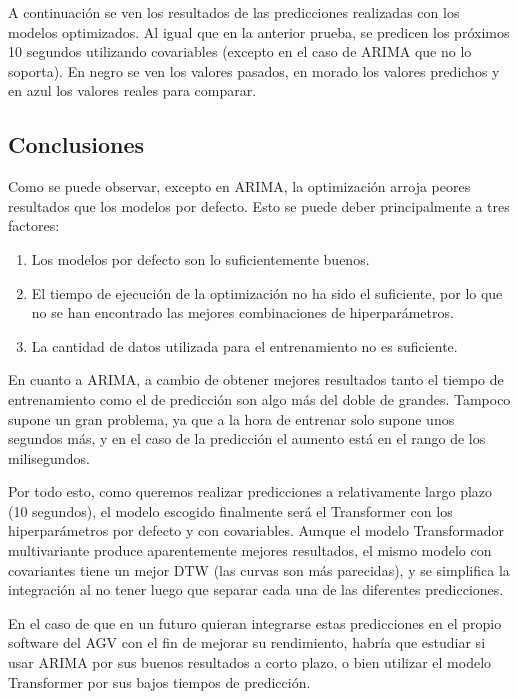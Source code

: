A continuación se ven los resultados de las predicciones realizadas con los modelos optimizados. 
Al igual que en la anterior prueba, se predicen los próximos 10 segundos utilizando covariables 
(excepto en el caso de ARIMA que no lo soporta). En negro se ven los valores pasados, en morado 
los valores predichos y en azul los valores reales para comparar.


\subsection{Conclusiones}

Como se puede observar, excepto en ARIMA, la optimización arroja peores resultados que los modelos por defecto. Esto 
se puede deber principalmente a tres factores:
\begin{enumerate}
    \item Los modelos por defecto son lo suficientemente buenos.
    \item El tiempo de ejecución de la optimización no ha sido el suficiente, por lo que no se han encontrado las 
        mejores combinaciones de hiperparámetros.
    \item La cantidad de datos utilizada para el entrenamiento no es suficiente.
\end{enumerate}

En cuanto a ARIMA, a cambio de obtener mejores resultados tanto el tiempo de entrenamiento como el de predicción 
son algo más del doble de grandes. Tampoco supone un gran problema, ya que a la hora de entrenar solo 
supone unos segundos más, y en el caso de la predicción el aumento está en el rango de los milisegundos.

Por todo esto, como queremos realizar predicciones a relativamente largo plazo (10 segundos), el modelo escogido 
finalmente será el Transformer con los hiperparámetros por defecto y con covariables. Aunque el modelo Transformador
multivariante produce aparentemente mejores resultados, el mismo modelo con covariantes tiene un mejor DTW (las curvas
son más parecidas), y se simplifica la integración al no tener luego que separar cada una de las diferentes predicciones. 

En el caso de que en un futuro quieran integrarse estas predicciones en el propio software del AGV con el fin 
de mejorar su rendimiento, habría que estudiar si usar ARIMA por sus buenos resultados a corto plazo, o bien 
utilizar el modelo Transformer por sus bajos tiempos de predicción.